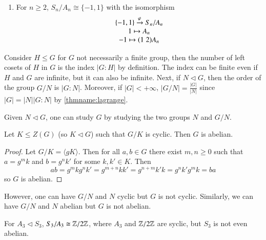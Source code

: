 \documentclass[12pt, a4paper, oneside, openright, titlepage]{book}
\begin{document}
\begin{eg}
\begin{enumerate}
\begin{proof}
\begin{equation}
                                \end{equation}
                                so $j$ is a homomorphism. Hence, $\R^{\times} \cong \GL_n(\R)/\SL_n(\R)$.
                        \end{proof}
                \item For $n \geq 2$, $S_n/A_n \cong \{-1,1\}$ with the isomorphism \begin{equation}
                                \begin{array}{c} \{-1,1\}\xrightarrow{\varphi} S_n/A_n \\ \begin{array}{c} 1\mapsto A_n \\ -1\mapsto (1\;2)A_n \end{array} \end{array}
                \end{equation}
        \end{enumerate}
\end{eg}

\begin{rmk}
        Consider $H\leq G$ for $G$ not necessarily a finite group, then the number of left cosets of $H$ in $G$ is the index $|G:H|$ by definition. The index can be finite even if $H$ and $G$ are infinite, but it can also be infinite. Next, if $N \vartriangleleft G$, then the order of the group $G/N$ is $|G:N|$. Moreover, if $|G| <+\infty$, $|G/N| = \frac{|G|}{|N|}$ since $|G| = |N||G:N|$ by \ref{thmname:lagrange}.
\end{rmk}

\begin{rmk}
        Given $N \vartriangleleft G$, one can study $G$ by studying the two groups $N$ and $G/N$.
\end{rmk}

\begin{thm}
        Let $K \leq Z(G)$ (so $K \vartriangleleft G$) such that $G/K$ is cyclic. Then $G$ is abelian.
\end{thm}
\begin{proof}
        Let $G/K = \langle gK \rangle$. Then for all $a,b \in G$ there exist $m,n \geq 0$ such that $a = g^mk$ and $b = g^nk'$ for some $k,k' \in K$. Then $$ab = g^mkg^nk' = g^{m+n}kk' = g^{n+m}k'k = g^nk'g^mk = ba$$ so $G$ is abelian.
\end{proof}

\begin{rmk}
        However, one can have $G/N$ and $N$ cyclic but $G$ is not cyclic. Similarly, we can have $G/N$ and $N$ abelian but $G$ is not abelian.
\end{rmk}

\begin{eg}
        For $A_3 \vartriangleleft S_3$, $S_3/A_3 \cong \mathbb Z/2\mathbb Z$, where $A_3$ and $\mathbb Z/2\mathbb Z$ are syclic, but $S_3$ is not even abelian.
\end{eg}
\end{document}
